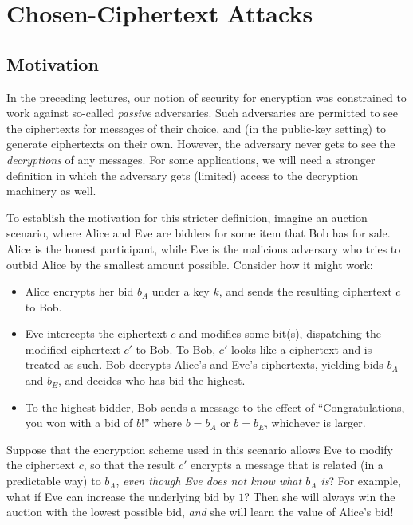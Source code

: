 \documentclass[11pt]{article}
\begin{document}
\thispagestyle{fancy}           %


\section{Chosen-Ciphertext Attacks}
\label{sec:chos-ciph-attacks}

\subsection{Motivation}
\label{sec:cca-motivation}

In the preceding lectures, our notion of security for encryption was
constrained to work against so-called \emph{passive} adversaries.
Such adversaries are permitted to see the ciphertexts for messages of
their choice, and (in the public-key setting) to generate ciphertexts
on their own.  However, the adversary never gets to see the
\emph{decryptions} of any messages.  For some applications, we will
need a stronger definition in which the adversary gets (limited)
access to the decryption machinery as well.

To establish the motivation for this stricter definition, imagine an
auction scenario, where Alice and Eve are bidders for some item that
Bob has for sale.  Alice is the honest participant, while Eve is the
malicious adversary who tries to outbid Alice by the smallest amount
possible.  Consider how it might work:
\begin{itemize}
\item Alice encrypts her bid $b_{A}$ under a key $k$, and sends the
  resulting ciphertext $c$ to Bob.
\item Eve intercepts the ciphertext $c$ and modifies some bit(s),
  dispatching the modified ciphertext $c'$ to Bob.  To Bob, $c'$ looks
  like a ciphertext and is treated as such.  Bob decrypts Alice's and
  Eve's ciphertexts, yielding bids $b_{A}$ and $b_{E}$, and decides who
  has bid the highest.
\item To the highest bidder, Bob sends a message to the effect of
  ``Congratulations, you won with a bid of $b$!'' where $b = b_A$ or
  $b=b_E$, whichever is larger.
\end{itemize}

Suppose that the encryption scheme used in this scenario allows Eve to
modify the ciphertext $c$, so that the result $c'$ encrypts a message
that is related (in a predictable way) to $b_{A}$, \emph{even though
  Eve does not know what $b_{A}$ is}?  For example, what if Eve can
increase the underlying bid by $1$?  Then she will always win the
auction with the lowest possible bid, \emph{and} she will learn the
value of Alice's bid!
\end{document}
